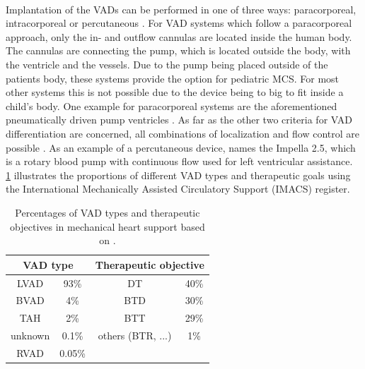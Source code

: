 \\Implantation of the VADs can be performed in one of three ways: paracorporeal, intracorporeal or percutaneous \cite{VAD7}. For VAD systems which follow a paracorporeal approach, only the in- and outflow cannulas are located inside the human body. The cannulas are connecting the pump, which is located outside the body, with the ventricle and the vessels. Due to the pump being placed outside of the patients body, these systems provide the option for pediatric MCS. For most other systems this is not possible due to the device being to big to fit inside a child's body. \cite{VAD10} One example for paracorporeal systems are the aforementioned pneumatically driven pump ventricles \cite{VAD1}. As far as the other two criteria for VAD differentiation are concerned, all combinations of localization and flow control are possible \cite{VAD10}. As an example of a percutaneous device, \cite{VAD7} names the Impella 2.5, which is a rotary blood pump with continuous flow used for left ventricular assistance. \tablename~ \ref{tab:Table2} illustrates the proportions of different VAD types and therapeutic goals using the International Mechanically Assisted Circulatory Support (IMACS) register.
\begin{table}
  \centering
  \begin{tabular}{cc|cc}
    \toprule
    \multicolumn{2}{c|}{VAD type} &
    \multicolumn{2}{c}{Therapeutic objective} \\
    \midrule
    LVAD & 93\% & DT & 40\%\\
    BVAD & 4\% & BTD & 30\%\\
    TAH & 2\% & BTT & 29\%\\
    unknown & 0.1\% & others (BTR, ...) & 1\%\\
    RVAD & 0.05\% & &\\
    \bottomrule
\end{tabular}
  \caption[Distribution of VAD types and therapeutic objectives]{Percentages of VAD types and therapeutic objectives in mechanical heart support based on \cite{VAD7}.}
  \label{tab:Table2}
\end{table}
